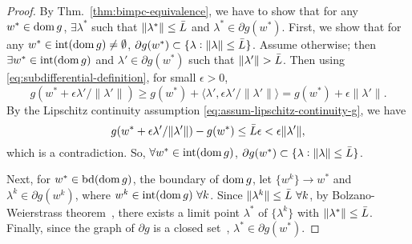 {\begin{proof}
By Thm.~\ref{thm:bimpc-equivalence}, we have to show that for any $w^* \in \operatorname{dom}{g}$, $\exists \lambda^*$ such that $\lVert \lambda^* \rVert \leq \bar{L}$ and $\lambda^* \in \partial g(w^*)$.
First, we show that for any $w^* \in \operatorname{int}(\operatorname{dom}{g}) \neq \emptyset$, $\partial g(w^*) \subset \{\lambda: \lVert \lambda \rVert \leq \bar{L}\}$.
Assume otherwise; then $\exists w^* \in \operatorname{int}(\operatorname{dom}{g})$ and $\lambda' \in \partial g(w^*)$ such that $\lVert \lambda' \rVert > \bar{L}$.
Then
using \eqref{eq:subdifferential-definition}, for small $\epsilon > 0$,
\begin{equation*}
    g(w^* + \epsilon \lambda'/\lVert \lambda'\rVert) \geq g(w^*) + \langle \lambda', \epsilon \lambda'/\lVert \lambda'\rVert \rangle = g(w^*) + \epsilon \lVert \lambda' \rVert.
\end{equation*}
By the Lipschitz continuity assumption \eqref{eq:assum-lipschitz-continuity-g}, we have
\begin{equation*}
    g(w^* + \epsilon \lambda'/\lVert \lambda'\rVert) - g(w^*) \leq \bar{L} \epsilon < \epsilon \lVert \lambda' \rVert,
\end{equation*}
which is a contradiction.
So, $\forall w^* \in \operatorname{int}(\operatorname{dom}{g})$, $\partial g(w^*) \subset \{\lambda: \lVert \lambda \rVert \leq \bar{L}\}$.

Next, for $w^* \in \operatorname{bd}(\operatorname{dom}{g})$, the boundary of $\operatorname{dom}{g}$, let $\{w^k\} \rightarrow w^*$ and $\lambda^k \in \partial g(w^k)$, where $w^k \in \operatorname{int}(\operatorname{dom}{g}) \ \forall k$.
Since $\lVert \lambda^k \rVert \leq \bar{L} \ \forall k$, by Bolzano-Weierstrass theorem~\cite[Thm.~2.42]{rudin1964principles}, there exists a limit point $\lambda^*$ of $\{\lambda^k\}$ with $\lVert \lambda^* \rVert \leq \bar{L}$.
Finally, since the graph of $\partial g$ is a closed set~\cite[Thm.~24.4]{rockafellar1997convex}, $\lambda^* \in \partial g(w^*)$.
\end{proof}

}


